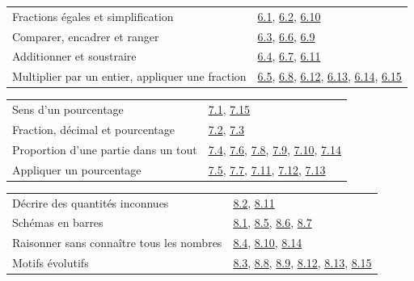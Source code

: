 \begin{tabularx}{\linewidth}{@{}Yl@{}}\toprule
Fractions égales et simplification & \hyperref[exo-6-1]{6.1}, \hyperref[exo-6-2]{6.2}, \hyperref[exo-6-10]{6.10}\\[2mm]
Comparer, encadrer et ranger & \hyperref[exo-6-3]{6.3}, \hyperref[exo-6-6]{6.6}, \hyperref[exo-6-9]{6.9}\\[2mm]
Additionner et soustraire & \hyperref[exo-6-4]{6.4}, \hyperref[exo-6-7]{6.7}, \hyperref[exo-6-11]{6.11}\\[2mm]
Multiplier par un entier, appliquer une fraction & \hyperref[exo-6-5]{6.5}, \hyperref[exo-6-8]{6.8}, \hyperref[exo-6-12]{6.12}, \hyperref[exo-6-13]{6.13}, \hyperref[exo-6-14]{6.14}, \hyperref[exo-6-15]{6.15}\\[2mm]
\bottomrule\end{tabularx}\par\vspace{4mm}
\clearpage
{}\fontsize{10}{13}\selectfont
{}\begin{tabularx}{\linewidth}{@{}Yl@{}}\toprule
Sens d’un pourcentage & \hyperref[exo-7-1]{7.1}, \hyperref[exo-7-15]{7.15}\\[2mm]
Fraction, décimal et pourcentage & \hyperref[exo-7-2]{7.2}, \hyperref[exo-7-3]{7.3}\\[2mm]
Proportion d’une partie dans un tout & \hyperref[exo-7-4]{7.4}, \hyperref[exo-7-6]{7.6}, \hyperref[exo-7-8]{7.8}, \hyperref[exo-7-9]{7.9}, \hyperref[exo-7-10]{7.10}, \hyperref[exo-7-14]{7.14}\\[2mm]
Appliquer un pourcentage & \hyperref[exo-7-5]{7.5}, \hyperref[exo-7-7]{7.7}, \hyperref[exo-7-11]{7.11}, \hyperref[exo-7-12]{7.12}, \hyperref[exo-7-13]{7.13}\\[2mm]
\bottomrule\end{tabularx}\par\vspace{4mm}
\begin{tabularx}{\linewidth}{@{}Yl@{}}\toprule
Décrire des quantités inconnues & \hyperref[exo-8-2]{8.2}, \hyperref[exo-8-11]{8.11}\\[2mm]
Schémas en barres & \hyperref[exo-8-1]{8.1}, \hyperref[exo-8-5]{8.5}, \hyperref[exo-8-6]{8.6}, \hyperref[exo-8-7]{8.7}\\[2mm]
Raisonner sans connaître tous les nombres & \hyperref[exo-8-4]{8.4}, \hyperref[exo-8-10]{8.10}, \hyperref[exo-8-14]{8.14}\\[2mm]
Motifs évolutifs & \hyperref[exo-8-3]{8.3}, \hyperref[exo-8-8]{8.8}, \hyperref[exo-8-9]{8.9}, \hyperref[exo-8-12]{8.12}, \hyperref[exo-8-13]{8.13}, \hyperref[exo-8-15]{8.15}\\[2mm]
\bottomrule\end{tabularx}\par\vspace{4mm}
